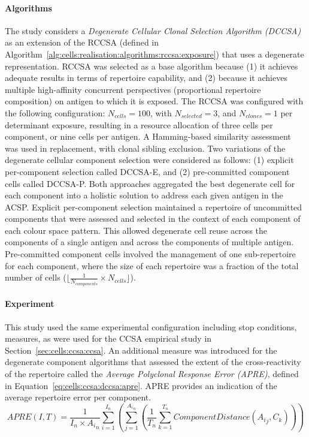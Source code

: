 \paragraph{Algorithms}
The study considers a \emph{Degenerate Cellular Clonal Selection Algorithm (DCCSA)} as an extension of the RCCSA (defined in Algorithm~\ref{alg:cells:realisation:algorithms:rccsa:exposure}) that uses a degenerate representation. RCCSA was selected as a base algorithm because (1) it achieves adequate results in terms of repertoire capability, and (2) because it achieves multiple high-affinity concurrent perspectives (proportional repertoire composition) on antigen to which it is exposed.
The RCCSA was configured with the following configuration: $N_{cells}=100$, with $N_{selected}=3$, and $N_{clones}=1$ per determinant exposure, resulting in a resource allocation of three cells per component, or nine cells per antigen. A Hamming-based similarity assessment was used in replacement, with clonal sibling exclusion. Two variations of the degenerate cellular component selection were considered as follows: (1) explicit per-component selection called DCCSA-E, and (2) pre-committed component cells called DCCSA-P. Both approaches aggregated the best degenerate cell for each component into a holistic solution to address each given antigen in the ACSP. Explicit per-component selection maintained a repertoire of uncommitted components that were assessed and selected in the context of each component of each colour space pattern. This allowed degenerate cell reuse across the components of a single antigen and across the components of multiple antigen. Pre-committed component cells involved the management of one sub-repertoire for each component, where the size of each repertoire was a fraction of the total number of cells ($\lfloor \frac{1}{N_{components}} \times N_{cells}\rfloor$). 


%
%
\paragraph{Experiment}
This study used the same experimental configuration including stop conditions, measures, as were used for the CCSA empirical study in Section~\ref{sec:cells:ccsa:ccsa}. 
An additional measure was introduced for the degenerate component algorithms that assessed the extent of the cross-reactivity of the repertoire called the \emph{Average Polyclonal Response Error (APRE)}, defined in Equation~\ref{eq:cells:ccsa:dccsa:apre}. APRE provides an indication of the average repertoire error per component. 
\begin{equation}
	APRE(I, T) = \frac{1}{I_n \times {A_i}_n} \sum_{i=1}^{I_n}
	\left(\sum_{j=1}^{{A_i}_n}
	\left(\frac{1}{T_n} \sum_{k=1}^{T_n}
	ComponentDistance({A_i}_j, C_k)	
	\right)\right)
	\label{eq:cells:ccsa:dccsa:apre}
\end{equation}


